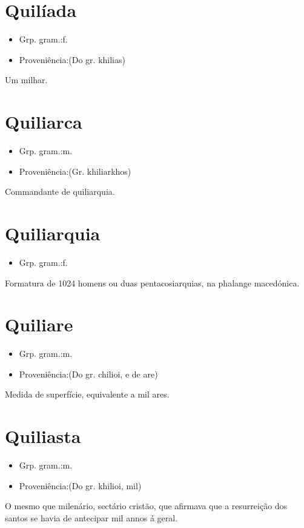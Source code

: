 \section{Quilíada}
\begin{itemize}
\item {Grp. gram.:f.}
\end{itemize}
\begin{itemize}
\item {Proveniência:(Do gr. \textunderscore khilias\textunderscore )}
\end{itemize}
Um milhar.
\section{Quiliarca}
\begin{itemize}
\item {Grp. gram.:m.}
\end{itemize}
\begin{itemize}
\item {Proveniência:(Gr. \textunderscore khiliarkhos\textunderscore )}
\end{itemize}
Commandante de quiliarquia.
\section{Quiliarquia}
\begin{itemize}
\item {Grp. gram.:f.}
\end{itemize}
Formatura de 1024 homens ou duas pentacosiarquias, na phalange macedónica.
\section{Quiliare}
\begin{itemize}
\item {Grp. gram.:m.}
\end{itemize}
\begin{itemize}
\item {Proveniência:(Do gr. \textunderscore chilioi\textunderscore , e de \textunderscore are\textunderscore )}
\end{itemize}
Medida de superfície, equivalente a mil ares.
\section{Quiliasta}
\begin{itemize}
\item {Grp. gram.:m.}
\end{itemize}
\begin{itemize}
\item {Proveniência:(Do gr. \textunderscore khilioi\textunderscore , mil)}
\end{itemize}
O mesmo que \textunderscore milenário\textunderscore , sectário cristão, que afirmava que a resurreição dos santos se havia de antecipar mil annos á geral.
